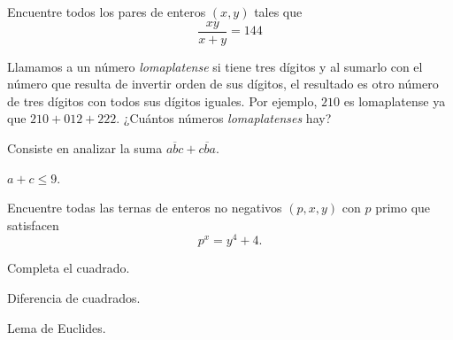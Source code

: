 \begin{problem}
Encuentre todos los pares de enteros $\left(x, y\right)$ tales que
\[\frac{xy}{x + y} = 144\]
\end{problem}
%
\begin{problem}[OMAPA 2025/1]
Llamamos a un número \textit{lomaplatense} si tiene tres dígitos y al sumarlo
con el número que resulta de invertir orden de sus dígitos,
el resultado es otro número de tres dígitos con todos sus dígitos
iguales. Por ejemplo, $210$ es lomaplatense ya que $210 + 012 + 222$.
¿Cuántos números \textit{lomaplatenses} hay?
\begin{hints}
	\begin{hint}
		Consiste en analizar la suma $\overline{abc} + \overline{cba}$.
	\end{hint}

	\begin{hint}
		$a + c \leq 9$.
	\end{hint}
\end{hints}
\end{problem}

\begin{problem}
Encuentre todas las ternas de enteros no negativos
$(p, x, y)$ con $p$ primo que satisfacen
\[p^x = y^4 + 4.\]
\begin{hints}
	\begin{hint}
		Completa el cuadrado.
	\end{hint}
	\begin{hint}
		Diferencia de cuadrados.
	\end{hint}
	\begin{hint}
		Lema de Euclides.
	\end{hint}
\end{hints}
\end{problem}

